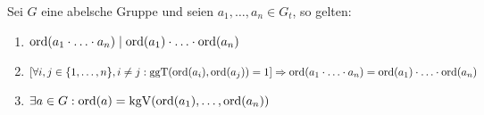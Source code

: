 \begin{lemma} \label{lemma:abelsch-torsion-lemma}
    Sei $G$ eine abelsche Gruppe und seien $a_1, \hdots, a_n \in G_t$, so gelten:
    \begin{enumerate}
        \item $ \operatorname{ord}(a_1 \cdot \hdots \cdot a_n) \mid \operatorname{ord}(a_1) \cdot \hdots \cdot \operatorname{ord}(a_n) $\label{item:lemma:abelsch-torsion-lemma-1}
        \item $ \left[\forall i, j \in \{ 1, \hdots, n \}, i \neq j: \mathrm{ggT}(\operatorname{ord}(a_i), \operatorname{ord}(a_j)) = 1\right] \Rightarrow \operatorname{ord}(a_1 \cdot \hdots \cdot a_n) = \operatorname{ord}(a_1) \cdot \hdots \cdot \operatorname{ord}(a_n) $\label{item:lemma:abelsch-torsion-lemma-2}
        \item $ \exists a \in G: \operatorname{ord}(a) = \mathrm{kgV}(\operatorname{ord}(a_1), \hdots, \operatorname{ord}(a_n)) $
    \end{enumerate}
\end{lemma}

